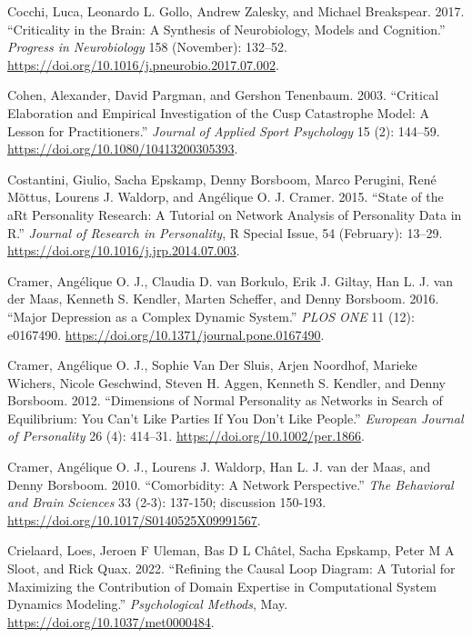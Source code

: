 \documentclass[
  letterpaper,
]{scrbook}
\newlength{\cslhangindent}
\newlength{\cslentryspacingunit} %
\newenvironment{CSLReferences}[2] %
 {%
  \setlength{\parindent}{0pt}
  \ifodd #1
  \let\oldpar\par
  \def\par{\hangindent=\cslhangindent\oldpar}
  \fi
  \setlength{\parskip}{#2\cslentryspacingunit}
 }%
 {}
\begin{document}
\begin{CSLReferences}{1}{0}
\leavevmode{}%
Cocchi, Luca, Leonardo L. Gollo, Andrew Zalesky, and Michael Breakspear.
2017. {``Criticality in the Brain: {A} Synthesis of Neurobiology, Models
and Cognition.''} \emph{Progress in Neurobiology} 158 (November):
132--52. \url{https://doi.org/10.1016/j.pneurobio.2017.07.002}.

\leavevmode{}%
Cohen, Alexander, David Pargman, and Gershon Tenenbaum. 2003.
{``Critical {Elaboration} and {Empirical Investigation} of the {Cusp
Catastrophe Model}: {A Lesson} for {Practitioners}.''} \emph{Journal of
Applied Sport Psychology} 15 (2): 144--59.
\url{https://doi.org/10.1080/10413200305393}.

\leavevmode{}%
Costantini, Giulio, Sacha Epskamp, Denny Borsboom, Marco Perugini, René
Mõttus, Lourens J. Waldorp, and Angélique O. J. Cramer. 2015. {``State
of the {aRt} Personality Research: {A} Tutorial on Network Analysis of
Personality Data in {R}.''} \emph{Journal of Research in Personality}, R
{Special Issue}, 54 (February): 13--29.
\url{https://doi.org/10.1016/j.jrp.2014.07.003}.

\leavevmode{}%
Cramer, Angélique O. J., Claudia D. van Borkulo, Erik J. Giltay, Han L.
J. van der Maas, Kenneth S. Kendler, Marten Scheffer, and Denny
Borsboom. 2016. {``Major Depression as a Complex Dynamic System.''}
\emph{PLOS ONE} 11 (12): e0167490.
\url{https://doi.org/10.1371/journal.pone.0167490}.

\leavevmode{}%
Cramer, Angélique O. J., Sophie Van Der Sluis, Arjen Noordhof, Marieke
Wichers, Nicole Geschwind, Steven H. Aggen, Kenneth S. Kendler, and
Denny Borsboom. 2012. {``Dimensions of Normal Personality as Networks in
Search of Equilibrium: You Can't Like Parties If You Don't Like
People.''} \emph{European Journal of Personality} 26 (4): 414--31.
\url{https://doi.org/10.1002/per.1866}.

\leavevmode{}%
Cramer, Angélique O. J., Lourens J. Waldorp, Han L. J. van der Maas, and
Denny Borsboom. 2010. {``Comorbidity: A Network Perspective.''}
\emph{The Behavioral and Brain Sciences} 33 (2-3): 137-150; discussion
150-193. \url{https://doi.org/10.1017/S0140525X09991567}.

\leavevmode{}%
Crielaard, Loes, Jeroen F Uleman, Bas D L Châtel, Sacha Epskamp, Peter M
A Sloot, and Rick Quax. 2022. {``Refining the Causal Loop Diagram: {A}
Tutorial for Maximizing the Contribution of Domain Expertise in
Computational System Dynamics Modeling.''} \emph{Psychological Methods},
May. \url{https://doi.org/10.1037/met0000484}.


\end{CSLReferences}
\end{document}
